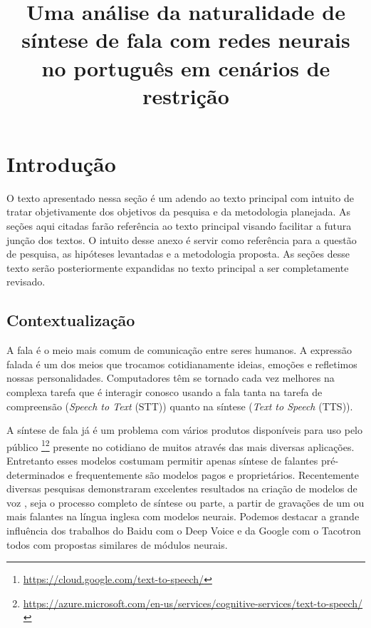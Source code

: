 \documentclass{article}
\begin{document}
\title{Uma análise da naturalidade de síntese de fala com redes neurais no português em cenários de restrição}

\maketitle

\section{Introdução}
O texto apresentado nessa seção é um adendo ao texto principal com intuito de tratar objetivamente dos objetivos da pesquisa e da metodologia planejada. 
As seções aqui citadas farão referência ao texto principal visando facilitar a futura junção dos textos.
O intuito desse anexo é servir como referência para a questão de pesquisa, as hipóteses levantadas e a metodologia proposta.
As seções desse texto serão posteriormente expandidas no texto principal a ser completamente revisado.
\subsection{Contextualização}
A fala é o meio mais comum de comunicação entre seres humanos\cite{flanang}. 
A expressão falada é um dos meios que trocamos cotidianamente ideias, emoções e refletimos nossas personalidades\cite{Tiwari2012}. 
Computadores têm se tornado cada vez melhores na complexa tarefa que é interagir conosco usando a fala \cite{HCI-voice} tanta na tarefa de compreensão (\emph{Speech to Text} (STT)) quanto na síntese (\emph{Text to Speech} (TTS)). 

A síntese de fala já é um problema com vários produtos disponíveis para uso pelo público \footnote{\url{https://cloud.google.com/text-to-speech/}}\footnote{\url{https://azure.microsoft.com/en-us/services/cognitive-services/text-to-speech/}} presente no cotidiano de muitos através das mais diversas aplicações.
Entretanto esses modelos costumam permitir apenas síntese de falantes pré-determinados e frequentemente são modelos pagos e proprietários. 
Recentemente diversas pesquisas demonstraram excelentes resultados na criação de modelos de voz , seja o processo completo de síntese ou parte, a partir de gravações de um ou mais falantes na língua inglesa com modelos neurais.
Podemos destacar a grande influência dos trabalhos do Baidu com o Deep Voice\cite{deepVoice,deepVoice2,deepvoice3, baiduVoiceClonning} e da Google com o Tacotron \cite{tacotron,tacotron2, wavenet} todos com propostas similares de módulos neurais.
\end{document}
